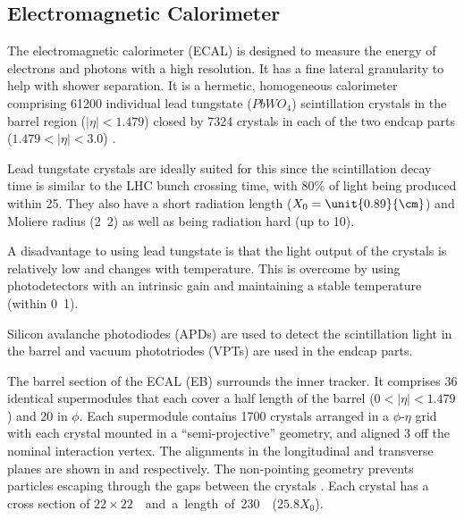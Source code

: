 
\subsection{Electromagnetic Calorimeter}
The electromagnetic calorimeter (ECAL) is designed to measure the energy of
electrons and photons with a high resolution. It has a fine lateral granularity
to help with shower separation. It is a hermetic, homogeneous calorimeter
comprising 61200 individual lead tungstate ($PbWO_{4}$) scintillation crystals
in the barrel region ($|\eta|<1.479$) closed by 7324 crystals in each of the two
endcap parts ($1.479<|\eta|<3.0$) \cite{ecal1997technical}.

Lead tungstate crystals are ideally suited for this since the scintillation
decay time is similar to the LHC bunch crossing time, 
with $80\%$ of light being produced within \unit{25}{\ns}.
They also have a short radiation length ($X_0=\unit{0.89}{\cm}$) 
and Moliere radius (\unit{2.2}{\cm}) as well as being radiation hard
(up to \unit{10}{\mrad}).

A disadvantage to using lead tungstate is that the light output of the crystals
is relatively low and changes with temperature. This is overcome by using
photodetectors with an intrinsic gain and maintaining a stable temperature
(within \unit{0.1}{\degreecelsius}).

Silicon avalanche photodiodes (APDs) are used to detect the scintillation light
in the barrel and vacuum phototriodes (VPTs) are used in the endcap parts.

The barrel section of the ECAL (EB) surrounds the inner tracker. It comprises 36
identical supermodules that each cover a half length of the barrel
($0<|\eta|<1.479$) and \unit{20}{\degree} in $\phi$. Each supermodule contains 1700
crystals arranged in a $\phi$-$\eta$ grid with each crystal mounted in a
``semi-projective'' geometry, and aligned \unit{3}{\degree} off the nominal
interaction vertex.  The alignments in the longitudinal and transverse planes
are shown in  and 
respectively. The non-pointing geometry prevents particles escaping through the
gaps between the crystals \cite{ecal1997technical}.  Each crystal has a
cross section of \unit{$22 \times 22$}{\mm\squared} and a length of
\unit{230}{\mm} ($\unit{25.8}{X_0}$).

